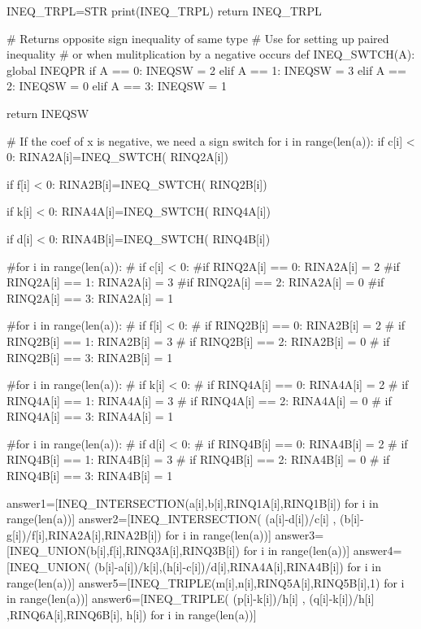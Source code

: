 \documentclass{article}%
\begin{document}
\begin{sagesilent}
  INEQ_TRPL=STR
  print(INEQ_TRPL)
  return INEQ_TRPL
  

# Returns opposite sign inequality of same type
# Use for setting up paired inequality
# or when mulitplication by a negative occurs
def INEQ_SWTCH(A):
  global INEQPR
  if   A == 0:    INEQSW = 2
  elif A == 1:    INEQSW = 3
  elif A == 2:    INEQSW = 0
  elif A == 3:    INEQSW = 1
  
  return INEQSW  
  
  
# If the coef of x is negative, we need a sign switch  
for i in range(len(a)):  
  if c[i] < 0:
    RINA2A[i]=INEQ_SWTCH( RINQ2A[i])
  
  if f[i] < 0:
    RINA2B[i]=INEQ_SWTCH( RINQ2B[i])
  
  if k[i] < 0:
    RINA4A[i]=INEQ_SWTCH( RINQ4A[i])
  
  if d[i] < 0:
    RINA4B[i]=INEQ_SWTCH( RINQ4B[i])
  
  
  
  
#for i in range(len(a)):  
#  if c[i] < 0:  
    #if RINQ2A[i] == 0:      RINA2A[i] = 2
    #if RINQ2A[i] == 1:      RINA2A[i] = 3
    #if RINQ2A[i] == 2:      RINA2A[i] = 0
    #if RINQ2A[i] == 3:      RINA2A[i] = 1  
    
#for i in range(len(a)):  
#  if f[i] < 0:
#    if RINQ2B[i] == 0:      RINA2B[i] = 2
#    if RINQ2B[i] == 1:      RINA2B[i] = 3
#    if RINQ2B[i] == 2:      RINA2B[i] = 0
#    if RINQ2B[i] == 3:      RINA2B[i] = 1  
    
#for i in range(len(a)):  
#  if k[i] < 0:
#    if RINQ4A[i] == 0:      RINA4A[i] = 2
#    if RINQ4A[i] == 1:      RINA4A[i] = 3
#    if RINQ4A[i] == 2:      RINA4A[i] = 0
#    if RINQ4A[i] == 3:      RINA4A[i] = 1 
    
#for i in range(len(a)):  
#  if d[i] < 0:
#    if RINQ4B[i] == 0:      RINA4B[i] = 2
#    if RINQ4B[i] == 1:      RINA4B[i] = 3
#    if RINQ4B[i] == 2:      RINA4B[i] = 0
#    if RINQ4B[i] == 3:      RINA4B[i] = 1     
  
answer1=[INEQ_INTERSECTION(a[i],b[i],RINQ1A[i],RINQ1B[i]) for i in range(len(a))] 
answer2=[INEQ_INTERSECTION(  (a[i]-d[i])/c[i] , (b[i]-g[i])/f[i],RINA2A[i],RINA2B[i]) for i in range(len(a))] 
answer3=[INEQ_UNION(b[i],f[i],RINQ3A[i],RINQ3B[i]) for i in range(len(a))] 
answer4=[INEQ_UNION( (b[i]-a[i])/k[i],(h[i]-c[i])/d[i],RINA4A[i],RINA4B[i]) for i in range(len(a))] 
answer5=[INEQ_TRIPLE(m[i],n[i],RINQ5A[i],RINQ5B[i],1) for i in range(len(a))] 
answer6=[INEQ_TRIPLE( (p[i]-k[i])/h[i] , (q[i]-k[i])/h[i]   ,RINQ6A[i],RINQ6B[i], h[i]) for i in range(len(a))] 




\end{sagesilent}
\end{document}
